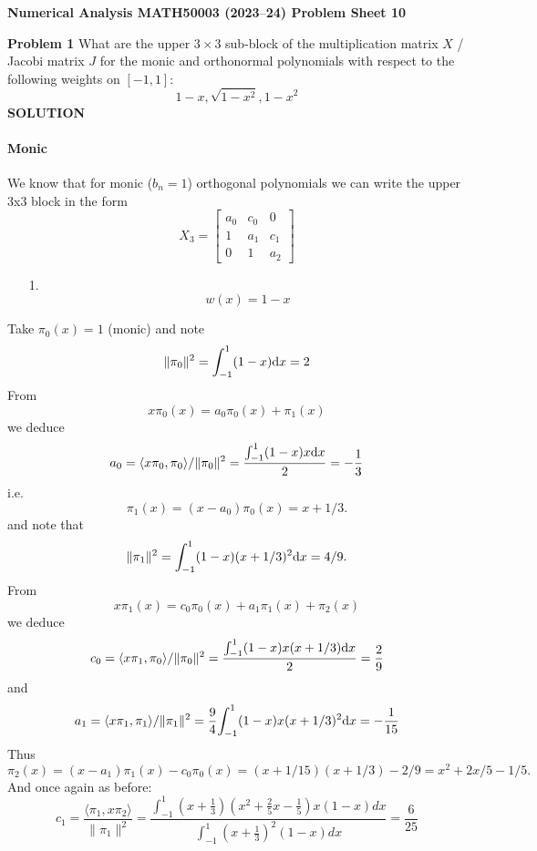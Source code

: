 \documentclass[12pt,a4paper]{article}
\def\endash{–}
\begin{document}
\textbf{Numerical Analysis MATH50003 (2023\ensuremath{\endash}24) Problem Sheet 10}

\textbf{Problem 1} What are the upper $3 \ensuremath{\times} 3$ sub-block of the multiplication matrix $X$ / Jacobi matrix $J$ for the monic and orthonormal polynomials with respect to the following weights on $[-1,1]$:
\[
1-x, \sqrt{1-x^2}, 1-x^2
\]
\textbf{SOLUTION}

\paragraph{Monic}
We know that for monic ($b_n=1$) orthogonal polynomials we can write the upper 3x3 block in the form
\[
X_3 = \begin{bmatrix} a_0 & c_0 & 0 \\ 1 & a_1 & c_1 \\ 0 & 1 & a_2 \end{bmatrix}
\]
\begin{itemize}
\item[1. ] \[
w(x) = 1-x
\]
\end{itemize}
Take $\ensuremath{\pi}_0(x) = 1$ (monic) and note
\[
\| \ensuremath{\pi}_0 \|^2 = \int_{-1}^1 (1-x) {\rm d}x = 2
\]
From
\[
x\ensuremath{\pi}_0(x) = a_0\ensuremath{\pi}_0(x) + \ensuremath{\pi}_1(x)
\]
we deduce
\[
a_0 = \ensuremath{\langle}x \ensuremath{\pi}_0, \ensuremath{\pi}_0\ensuremath{\rangle}/\|\ensuremath{\pi}_0\|^2 =  {\int_{-1}^1 (1-x) x {\rm d}x \over 2} =  -{1 \over 3}
\]
i.e.
\[
\ensuremath{\pi}_1(x) = (x-a_0) \ensuremath{\pi}_0(x) = x + 1/3.
\]
and note that
\[
\|\ensuremath{\pi}_1\|^2 = \int_{-1}^1 (1-x) (x+1/3)^2 {\rm d} x = 4/9.
\]
From
\[
x\ensuremath{\pi}_1(x) = c_0 \ensuremath{\pi}_0(x) + a_1 \ensuremath{\pi}_1(x) + \ensuremath{\pi}_2(x)
\]
we deduce
\[
c_0 = \ensuremath{\langle}x \ensuremath{\pi}_1, \ensuremath{\pi}_0\ensuremath{\rangle}/\|\ensuremath{\pi}_0\|^2 =  {\int_{-1}^1 (1-x) x (x+1/3) {\rm d}x \over 2} =  {2 \over 9}
\]
and
\[
a_1 = \ensuremath{\langle}x \ensuremath{\pi}_1, \ensuremath{\pi}_1\ensuremath{\rangle}/\|\ensuremath{\pi}_1\|^2 =  {9 \over 4} {\int_{-1}^1 (1-x) x (x+1/3)^2 {\rm d}x} =  -{1 \over 15}
\]
Thus
\[
\ensuremath{\pi}_2(x) = (x - a_1) \ensuremath{\pi}_1(x) - c_0 \ensuremath{\pi}_0(x) = (x+1/15) (x+1/3) - 2/9 = x^2 + 2x/5 -1/5.
\]
And once again as before:
\[
c_1=\frac{\ensuremath{\langle} \ensuremath{\pi}_1, x\ensuremath{\pi}_2\ensuremath{\rangle}}{\|\ensuremath{\pi}_1\|^2}= \frac{\int_{-1}^1 (x+\frac{1}{3})(x^2+\frac{2}{5}x- \frac{1}{5}) x(1-x) dx}{\int_{-1}^1 (x+\frac{1}{3})^2 (1-x) dx}= \frac{6}{25}
\]
\end{document}
